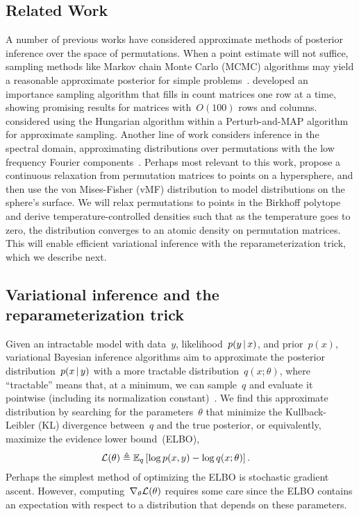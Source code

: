 \documentclass[twoside]{article}
\begin{document}
\subsection{Related Work}
A number of previous works have considered approximate methods of
posterior inference over the space of permutations.  When a point
estimate will not suffice, sampling methods like Markov chain Monte
Carlo (MCMC) algorithms may yield a reasonable approximate posterior
for simple problems~\citep{diaconis1988group}.
\citet{harrison2013importance} developed an importance sampling
algorithm that fills in count matrices one row at a time, showing
promising results for matrices with~$O(100)$ rows and
columns. \citep{li2013efficient} considered using the Hungarian
algorithm within a Perturb-and-MAP algorithm for approximate sampling.
Another line of work considers inference in the spectral domain,
approximating distributions over permutations with the low frequency
Fourier components~\citep{kondor2007multi, huang2009fourier}.  Perhaps
most relevant to this work, \citet{plis2011directional} propose a
continuous relaxation from permutation matrices to points on a
hypersphere, and then use the von Mises-Fisher (vMF) distribution to
model distributions on the sphere's surface.
We will relax permutations to points in the Birkhoff polytope and
derive temperature-controlled densities such that as the
temperature goes to zero, the distribution converges to an atomic
density on permutation matrices.  This will enable efficient variational
inference with the reparameterization trick, which we describe next. 



\subsection{Variational inference and the reparameterization trick}
\label{sub:repa}
Given an intractable model with data~$y$, likelihood~$p(y \, | \, x)$,
and prior~$p(x)$, variational Bayesian inference algorithms aim to
approximate the posterior distribution~$p(x \, | \, y)$ with a more
tractable distribution~$q(x; \theta)$, where ``tractable'' means that,
at a minimum, we can sample~$q$ and evaluate it pointwise (including
its normalization constant)~\citep{Blei2017}.  We find this
approximate distribution by searching for the parameters~$\theta$ that
minimize the Kullback-Leibler (KL) divergence between~$q$ and the true
posterior, or equivalently, maximize the evidence lower bound~(ELBO),
\begin{align*}
  \mathcal{L}(\theta) &\triangleq \mathbb{E}_q \left[ \log p(x, y) - \log q(x; \theta) \right].
\end{align*}
Perhaps the simplest method of optimizing the ELBO is stochastic
gradient ascent.  However, computing~$\nabla_\theta \mathcal{L}(\theta)$
requires some care since the ELBO contains an expectation with respect
to a distribution that depends on these parameters.
\end{document}
